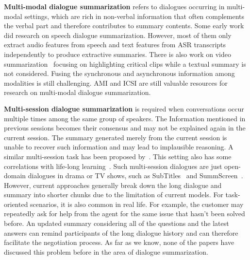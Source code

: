 

\textbf{Multi-modal dialogue summarization} refers to dialogues occurring in 
multi-modal settings, which are rich in non-verbal information 
that often complements the verbal part and therefore contributes to 
summary contents. Some early work did research on speech dialogue summarization. 
However, most of them only extract audio features from speech and text 
features from ASR transcripts independently to produce extractive summaries. 
There is also work on video summarization~\cite{hussain2021video} focusing 
on highlighting critical clips while a textual summary is not considered.
Fusing the synchronous and asynchronous information among modalities 
is still challenging. AMI and ICSI are still valuable resources for 
research on multi-modal dialogue summarization.


\textbf{Multi-session dialogue summarization} is required when conversations 
occur multiple times among the same group of speakers. 
The Information mentioned in previous sessions becomes their consensus and 
may not be explained again in the current session. 
The summary generated merely from the current session is unable to 
recover such information and may lead to implausible reasoning. 
A similar multi-session task has been proposed by~\citet{xu2021beyond}. 
This setting also has some correlations with life-long learning~\cite{shuster2020deploying,liu2021lifelong}.
Such multi-session dialogues are just open-domain dialogues in drama or TV shows, such as SubTitles~\cite{malykh2020sumtitles} and SummScreen~\cite{chen2021summscreen}. However, current approaches generally break down the long dialogue and summary into shorter chunks due to the limitation of current models. 
For task-oriented scenarios, it is also common in real life. For example, the customer may repeatedly ask for help from the agent for the same issue that hasn't been solved before. An updated summary considering all of the questions and the latest answers can remind participants of the long dialogue history and can therefore facilitate the negotiation process. As far as we know, none of the papers have discussed this problem before in the area of dialogue summarization.



